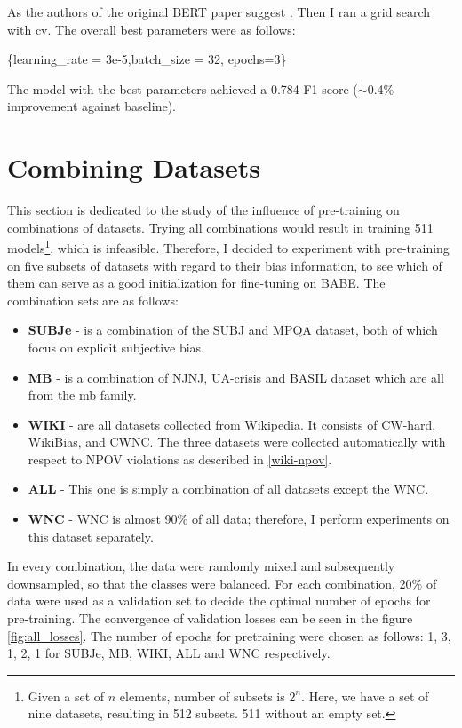  As the authors of the original BERT paper suggest \cite{devlin2019bert}. Then I ran a grid search with \gls{cv}. The overall best parameters were as follows:
 \begin{center}
      \{learning\_rate = 3e-5,batch\_size = 32, epochs=3\}\label{hyperparams}
 \end{center}
 
 The model with the best parameters achieved a 0.784 F1 score ($\sim$0.4\% improvement against baseline).


 
 





\section{Combining Datasets}
This section is dedicated to the study of the influence of pre-training on combinations of datasets. Trying all combinations would result in training 511 models\footnote{Given a set of $n$ elements, number of subsets is $2^n$. Here, we have a set of nine datasets, resulting in 512 subsets. 511 without an empty set.}, which is infeasible. Therefore, I decided to experiment with pre-training on five subsets of datasets with regard to their bias information, to see which of them can serve as a good initialization for fine-tuning on BABE.
The combination sets are as follows:
\begin{itemize}
    \item \textbf{SUBJe} - is a combination of the SUBJ and MPQA dataset, both of which focus on explicit subjective bias.
    \item \textbf{MB} - is a combination of NJNJ, UA-crisis and BASIL dataset which are all from the \gls{mb} family.
    \item \textbf{WIKI} - are all datasets collected from Wikipedia. It consists of CW-hard, WikiBias, and CWNC. The three datasets were collected automatically with respect to NPOV violations as described in \ref{wiki-npov}.
    \item \textbf{ALL} - This one is simply a combination of all datasets except the WNC.
    \item \textbf{WNC} - WNC is almost 90\% of all data; therefore, I perform experiments on this dataset separately.
\end{itemize}
 
In every combination, the data were randomly mixed and subsequently downsampled, so that the classes were balanced. For each combination, 20\% of data were used as a validation set to decide the optimal number of epochs for pre-training. The convergence of validation losses can be seen in the figure \ref{fig:all_losses}. The number of epochs for pretraining were chosen as follows: 1, 3, 1, 2, 1 for SUBJe, MB, WIKI, ALL and WNC respectively.

